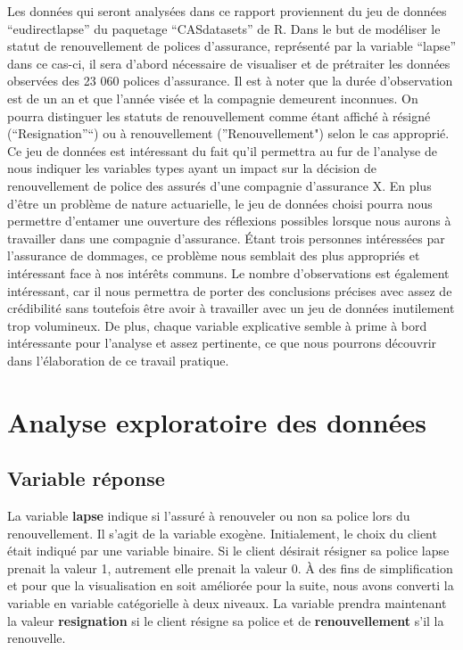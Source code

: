 \documentclass[
]{article}
\begin{document}
Les données qui seront analysées dans ce rapport proviennent du jeu de
données ``eudirectlapse'' du paquetage ``CASdatasets'' de R. Dans le but
de modéliser le statut de renouvellement de polices d'assurance,
représenté par la variable ``lapse'' dans ce cas-ci, il sera d'abord
nécessaire de visualiser et de prétraiter les données observées des 23
060 polices d'assurance. Il est à noter que la durée d'observation est
de un an et que l'année visée et la compagnie demeurent inconnues. On
pourra distinguer les statuts de renouvellement comme étant affiché à
résigné (``Resignation''``) ou à renouvellement (''Renouvellement")
selon le cas approprié. Ce jeu de données est intéressant du fait qu'il
permettra au fur de l'analyse de nous indiquer les variables types ayant
un impact sur la décision de renouvellement de police des assurés d'une
compagnie d'assurance X. En plus d'être un problème de nature
actuarielle, le jeu de données choisi pourra nous permettre d'entamer
une ouverture des réflexions possibles lorsque nous aurons à travailler
dans une compagnie d'assurance. Étant trois personnes intéressées par
l'assurance de dommages, ce problème nous semblait des plus appropriés
et intéressant face à nos intérêts communs. Le nombre d'observations est
également intéressant, car il nous permettra de porter des conclusions
précises avec assez de crédibilité sans toutefois être avoir à
travailler avec un jeu de données inutilement trop volumineux. De plus,
chaque variable explicative semble à prime à bord intéressante pour
l'analyse et assez pertinente, ce que nous pourrons découvrir dans
l'élaboration de ce travail pratique.

\newpage

\hypertarget{analyse-exploratoire-des-donnuxe9es}{%
\section{Analyse exploratoire des
données}\label{analyse-exploratoire-des-donnuxe9es}}

\hypertarget{variable-ruxe9ponse}{%
\subsection{Variable réponse}\label{variable-ruxe9ponse}}

La variable \textbf{lapse} indique si l'assuré à renouveler ou non sa
police lors du renouvellement. Il s'agit de la variable exogène.
Initialement, le choix du client était indiqué par une variable binaire.
Si le client désirait résigner sa police lapse prenait la valeur 1,
autrement elle prenait la valeur 0. À des fins de simplification et pour
que la visualisation en soit améliorée pour la suite, nous avons
converti la variable en variable catégorielle à deux niveaux. La
variable prendra maintenant la valeur \textbf{resignation} si le client
résigne sa police et de \textbf{renouvellement} s'il la renouvelle.
\end{document}
